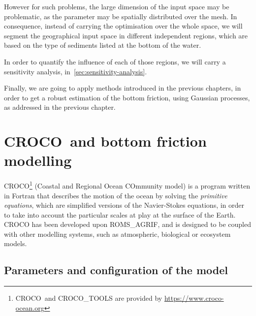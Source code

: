 \documentclass[../../Main_ManuscritThese.tex]{subfiles}
\newcommand{\CROCO}{CROCO}
\begin{document}
However for such problems, the large dimension of the input space may
be problematic, as the parameter may be spatially distributed over the
mesh. In consequence, instead of carrying the optimisation over the whole space, we
will segment the geographical input space in different independent
regions, which are based on the type of sediments listed at the bottom
of the water.

In order to quantify the influence of each of those
regions, we will carry a sensitivity analysis, in~\cref{sec:sensitivity-analysis}.


Finally, we are going to apply methods introduced in the previous
chapters, in order to get a robust estimation of the bottom friction,
using Gaussian processes, as addressed in the previous chapter.



\section{\CROCO\ and bottom friction modelling}
\label{sec:croco_bottom_fr}
\CROCO{}\footnote{\CROCO\ and CROCO\_TOOLS are provided by
  \url{https://www.croco-ocean.org}} (Coastal and Regional Ocean
COmmunity model) is a program written in Fortran that describes the
motion of the ocean by solving the \emph{primitive equations}, which
are simplified versions of the Navier-Stokes equations, in order to
take into account the particular scales at play at the surface of the
Earth. \CROCO{} has been developed upon ROMS\_AGRIF, and is designed
to be coupled with other modelling systems, such as atmospheric,
biological or ecosystem models.



\subsection{Parameters and configuration of the model}
\label{sec:geographical_setting}
\end{document}
